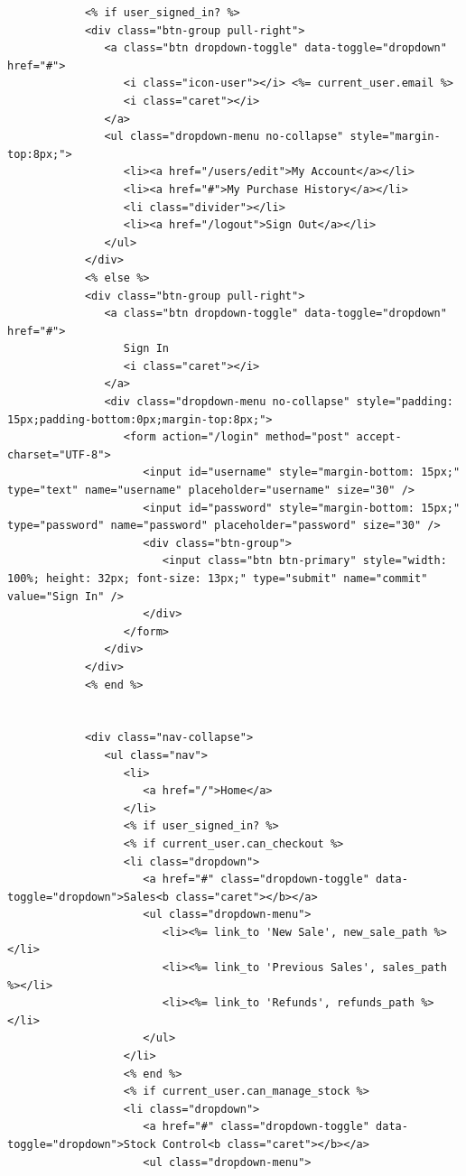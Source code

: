 \documentclass[a4paper]{article}
\begin{document}
\begin{verbatim}
            <% if user_signed_in? %>
            <div class="btn-group pull-right">
               <a class="btn dropdown-toggle" data-toggle="dropdown" href="#">
                  <i class="icon-user"></i> <%= current_user.email %>
                  <i class="caret"></i>
               </a>
               <ul class="dropdown-menu no-collapse" style="margin-top:8px;">
                  <li><a href="/users/edit">My Account</a></li>
                  <li><a href="#">My Purchase History</a></li>
                  <li class="divider"></li>
                  <li><a href="/logout">Sign Out</a></li>
               </ul>
            </div>
            <% else %>
            <div class="btn-group pull-right">
               <a class="btn dropdown-toggle" data-toggle="dropdown" href="#">
                  Sign In
                  <i class="caret"></i>
               </a>
               <div class="dropdown-menu no-collapse" style="padding: 15px;padding-bottom:0px;margin-top:8px;">
                  <form action="/login" method="post" accept-charset="UTF-8">
                     <input id="username" style="margin-bottom: 15px;" type="text" name="username" placeholder="username" size="30" />
                     <input id="password" style="margin-bottom: 15px;" type="password" name="password" placeholder="password" size="30" />
                     <div class="btn-group">
                        <input class="btn btn-primary" style="width: 100%; height: 32px; font-size: 13px;" type="submit" name="commit" value="Sign In" />
                     </div>
                  </form>
               </div>
            </div>
            <% end %>


            <div class="nav-collapse">
               <ul class="nav">
                  <li>
                     <a href="/">Home</a>
                  </li>
                  <% if user_signed_in? %>
                  <% if current_user.can_checkout %>
                  <li class="dropdown">
                     <a href="#" class="dropdown-toggle" data-toggle="dropdown">Sales<b class="caret"></b></a>
                     <ul class="dropdown-menu">
                        <li><%= link_to 'New Sale', new_sale_path %></li>
                        <li><%= link_to 'Previous Sales', sales_path %></li>
                        <li><%= link_to 'Refunds', refunds_path %></li>
                     </ul>
                  </li>
                  <% end %>
                  <% if current_user.can_manage_stock %>
                  <li class="dropdown">
                     <a href="#" class="dropdown-toggle" data-toggle="dropdown">Stock Control<b class="caret"></b></a>
                     <ul class="dropdown-menu">


\end{verbatim}
\end{document}

